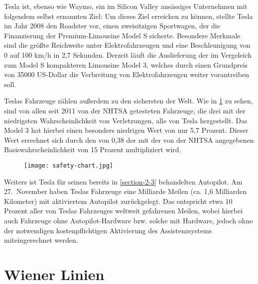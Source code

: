 Tesla ist, ebenso wie Waymo, ein im Silicon Valley ansässiges Unternehmen mit folgendem selbst ernannten Ziel:  Um dieses Ziel erreichen zu können, stellte Tesla im Jahr 2008 den Roadster vor, einen zweisitzigen Sportwagen, der die Finanzierung der Premium-Limousine Model S sicherte. Besondere Merkmale sind die größte Reichweite unter Elektrofahrzeugen und eine Beschleunigung von 0 auf 100 \si[per-mode=symbol]{\kilo\metre\per\hour} in 2,7 Sekunden. Derzeit läuft die Auslieferung der im Vergeleich zum Model S kompakteren Limousine Model 3, welches durch einen Grundpreis von \num{35000} US-Dollar die Verbreitung von Elektrofahrzeugen weiter vorantreiben soll.

Teslas Fahrzeuge zählen außerdem zu den sichersten der Welt. Wie in \ref{safety-chart} zu sehen, sind von allen seit 2011 von der \ac{NHTSA} getesteten Fahrzeuge, die drei mit der niedrigsten Wahrscheinlichkeit von Verletzungen, alle von Tesla hergestellt. Das Model 3 hat hierbei einen besonders niedrigen Wert von nur 5,7 Prozent. Dieser Wert errechnet sich durch den  von 0,38 der mit der von der \ac{NHTSA} angegebenen Basiswahrscheinlichkeit von 15 Prozent multipliziert wird. 

\begin{figure}\centering
  \texttt{[image: safety-chart.jpg]}
  \label{safety-chart}
\end{figure}

Weiters ist Tesla für seinen bereits in \ref{section-2-3} behandelten Autopilot. Am 27.\ November haben Teslas Fahrzeuge eine Milliarde Meilen (ca. 1,6 Milliarden Kilometer) mit aktiviertem Autopilot zurückgelegt. Das entspricht etwa 10 Prozent aller von Teslas Fahrzeuges weltweit gefahrenen Meilen, wobei hierbei auch Fahrzeuge ohne Autopilot-Hardware bzw. solche mit Hardware, jedoch ohne der notwendigen kostenpflichtigen Aktivierung des Assistenzsystems miteingerechnet werden. 


\section{Wiener Linien}


